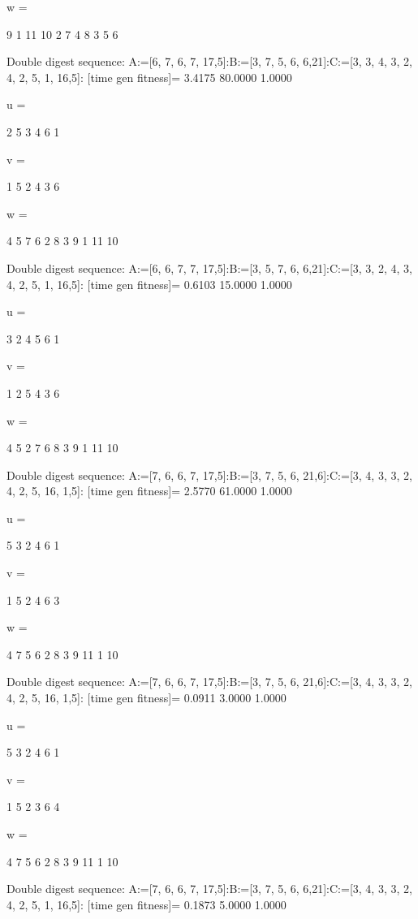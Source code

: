 w =

     9     1    11    10     2     7     4     8     3     5     6

Double digest sequence:
A:=[6, 7, 6, 7, 17,5]:B:=[3, 7, 5, 6, 6,21]:C:=[3, 3, 4, 3, 2, 4, 2, 5, 1, 16,5]:
[time gen fitness]=
    3.4175   80.0000    1.0000


u =

     2     5     3     4     6     1


v =

     1     5     2     4     3     6


w =

     4     5     7     6     2     8     3     9     1    11    10

Double digest sequence:
A:=[6, 6, 7, 7, 17,5]:B:=[3, 5, 7, 6, 6,21]:C:=[3, 3, 2, 4, 3, 4, 2, 5, 1, 16,5]:
[time gen fitness]=
    0.6103   15.0000    1.0000


u =

     3     2     4     5     6     1


v =

     1     2     5     4     3     6


w =

     4     5     2     7     6     8     3     9     1    11    10

Double digest sequence:
A:=[7, 6, 6, 7, 17,5]:B:=[3, 7, 5, 6, 21,6]:C:=[3, 4, 3, 3, 2, 4, 2, 5, 16, 1,5]:
[time gen fitness]=
    2.5770   61.0000    1.0000


u =

     5     3     2     4     6     1


v =

     1     5     2     4     6     3


w =

     4     7     5     6     2     8     3     9    11     1    10

Double digest sequence:
A:=[7, 6, 6, 7, 17,5]:B:=[3, 7, 5, 6, 21,6]:C:=[3, 4, 3, 3, 2, 4, 2, 5, 16, 1,5]:
[time gen fitness]=
    0.0911    3.0000    1.0000


u =

     5     3     2     4     6     1


v =

     1     5     2     3     6     4


w =

     4     7     5     6     2     8     3     9    11     1    10

Double digest sequence:
A:=[7, 6, 6, 7, 17,5]:B:=[3, 7, 5, 6, 6,21]:C:=[3, 4, 3, 3, 2, 4, 2, 5, 1, 16,5]:
[time gen fitness]=
    0.1873    5.0000    1.0000


